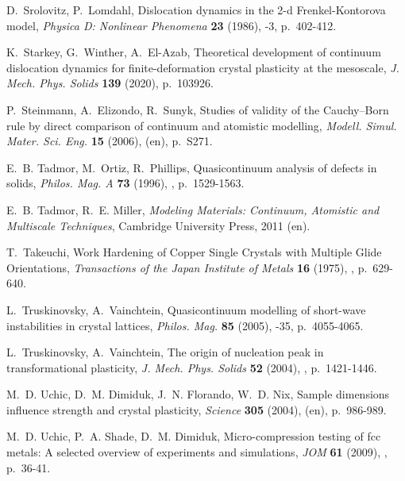 \documentclass[CRPHYS,Unicode,manuscript]{cedram}
\begin{document}
\begin{thebibliography}{100}
D.~Srolovitz, P.~Lomdahl, {\og Dislocation dynamics in the 2-d
  Frenkel-Kontorova model\fg}, \emph{Physica D: Nonlinear Phenomena}
  \textbf{23} (1986), -3, p.~402-412.

K.~Starkey, G.~Winther, A.~El-Azab, {\og Theoretical development of continuum
  dislocation dynamics for finite-deformation crystal plasticity at the
  mesoscale\fg}, \emph{J. Mech. Phys. Solids} \textbf{139} (2020), p.~103926.

P.~Steinmann, A.~Elizondo, R.~Sunyk, {\og Studies of validity of the
  {Cauchy--Born} rule by direct comparison of continuum and atomistic
  modelling\fg}, \emph{Modell. Simul. Mater. Sci. Eng.} \textbf{15} (2006),
   (en), p.~S271.

E.~B. Tadmor, M.~Ortiz, R.~Phillips, {\og Quasicontinuum analysis of defects in
  solids\fg}, \emph{Philos. Mag. A} \textbf{73} (1996), ,
  p.~1529-1563.

E.~B. Tadmor, R.~E. Miller, \emph{Modeling Materials: Continuum, Atomistic and
  Multiscale Techniques}, Cambridge University Press, 2011 (en).

T.~Takeuchi, {\og Work Hardening of Copper Single Crystals with Multiple Glide
  Orientations\fg}, \emph{Transactions of the Japan Institute of Metals}
  \textbf{16} (1975), , p.~629-640.

L.~Truskinovsky, A.~Vainchtein, {\og Quasicontinuum modelling of short-wave
  instabilities in crystal lattices\fg}, \emph{Philos. Mag.} \textbf{85}
  (2005), -35, p.~4055-4065.

L.~Truskinovsky, A.~Vainchtein, {\og The origin of nucleation peak in
  transformational plasticity\fg}, \emph{J. Mech. Phys. Solids} \textbf{52}
  (2004), , p.~1421-1446.

M.~D. Uchic, D.~M. Dimiduk, J.~N. Florando, W.~D. Nix, {\og Sample dimensions
  influence strength and crystal plasticity\fg}, \emph{Science} \textbf{305}
  (2004),  (en), p.~986-989.

M.~D. Uchic, P.~A. Shade, D.~M. Dimiduk, {\og Micro-compression testing of fcc
  metals: A selected overview of experiments and simulations\fg}, \emph{JOM}
  \textbf{61} (2009), , p.~36-41.


\end{thebibliography}
\end{document}
